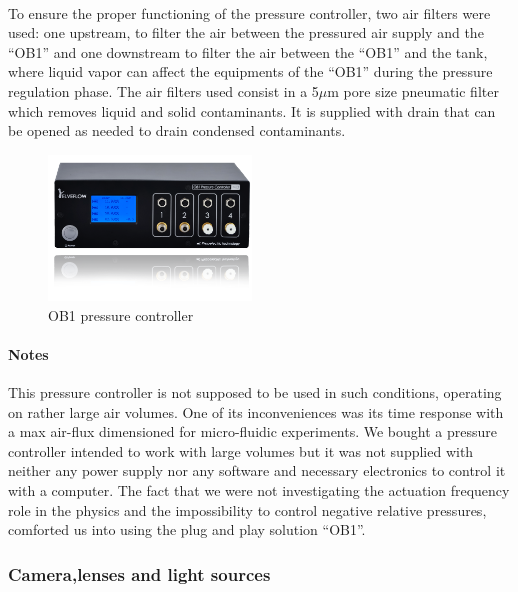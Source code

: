 \paragraph{}
To ensure the proper functioning of the pressure controller, two air filters were used: one upstream, to filter the air between the pressured air supply and the "`OB1"' and one downstream to filter the air between the "`OB1"' and the tank, where liquid vapor can affect the equipments of the "`OB1"' during the pressure regulation phase.
The air filters used consist in a 5$\mu$m pore size pneumatic filter which removes liquid and solid contaminants. It is supplied with drain that can be opened as needed to drain condensed contaminants.
\begin{figure}[H] %
	\centering%
  \includegraphics[width=0.48\textwidth]{figures/Chapter_1/OB1.png}
	\caption{OB1 pressure controller}
	\label{fig:ob1}
\end{figure}
\paragraph{Notes}
This pressure controller is not supposed to be used in such conditions, operating on rather large air volumes. One of its inconveniences was its time response with a max air-flux dimensioned for micro-fluidic experiments. We bought a pressure controller intended to work with large volumes but it was not supplied with neither any power supply nor any software and necessary electronics to control it with a computer. The fact that we were not investigating the actuation frequency role in the physics and the impossibility to control negative relative pressures, comforted us into using the plug and play solution "`OB1"'.

\subsubsection{Camera,lenses and light sources}
\label{sssection:CLLS}

